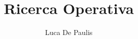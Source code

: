 \documentclass[italian,oneside,headinclude,10pt]{scrbook}
\begin{document}
\author{Luca De Paulis}
\title{Ricerca Operativa}
\maketitle

\tableofcontents

% 


\end{document}
